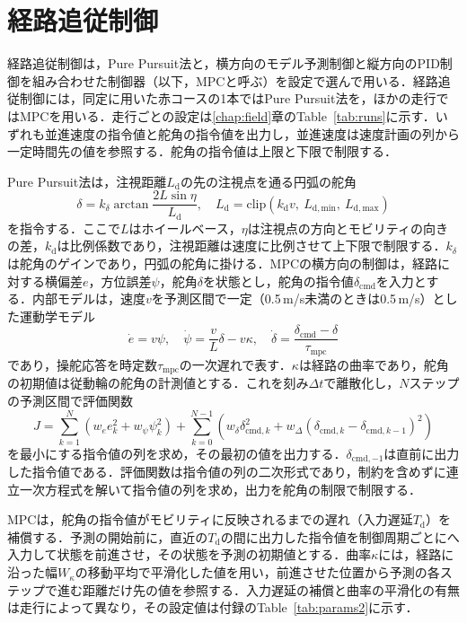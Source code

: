 \section{経路追従制御}
\label{sec:tracker}
経路追従制御は，Pure Pursuit法\cite{coulter1992}と，横方向のモデル予測制御と縦方向のPID制御を組み合わせた制御器（以下，MPCと呼ぶ）を設定で選んで用いる．経路追従制御には，同定に用いた赤コースの1本ではPure Pursuit法を，ほかの走行ではMPCを用いる．走行ごとの設定は\ref{chap:field}章のTable~\ref{tab:runs}に示す．いずれも並進速度の指令値と舵角の指令値を出力し，並進速度は速度計画の列から一定時間先の値を参照する．舵角の指令値は上限と下限で制限する．

Pure Pursuit法は，注視距離$L_{\mathrm{d}}$の先の注視点を通る円弧の舵角
\begin{equation}
  \delta = k_{\delta} \arctan\frac{2 L \sin\eta}{L_{\mathrm{d}}},\quad
  L_{\mathrm{d}} = \mathrm{clip}\left(k_{\mathrm{d}} v,\ L_{\mathrm{d,min}},\ L_{\mathrm{d,max}}\right)
  \label{eq:pp}
\end{equation}
を指令する．ここで$L$はホイールベース，$\eta$は注視点の方向とモビリティの向きの差，$k_{\mathrm{d}}$は比例係数であり，注視距離は速度に比例させて上下限で制限する．$k_{\delta}$は舵角のゲインであり，円弧の舵角に掛ける．MPCの横方向の制御は，経路に対する横偏差$e$，方位誤差$\psi$，舵角$\delta$を状態とし，舵角の指令値$\delta_{\mathrm{cmd}}$を入力とする．内部モデルは，速度$v$を予測区間で一定（0.5\,m/s未満のときは0.5\,m/s）とした運動学モデル
\begin{equation}
  \dot{e} = v\psi,\quad \dot{\psi} = \frac{v}{L}\delta - v\kappa,\quad \dot{\delta} = \frac{\delta_{\mathrm{cmd}} - \delta}{\tau_{\mathrm{mpc}}}
  \label{eq:mpc}
\end{equation}
であり，操舵応答を時定数$\tau_{\mathrm{mpc}}$の一次遅れで表す．$\kappa$は経路の曲率であり，舵角の初期値は従動輪の舵角の計測値とする．これを刻み$\Delta t$で離散化し，$N$ステップの予測区間で評価関数
\begin{equation}
  J = \sum_{k=1}^{N}\left(w_e e_k^2 + w_\psi \psi_k^2\right) + \sum_{k=0}^{N-1}\left(w_\delta \delta_{\mathrm{cmd},k}^2 + w_{\Delta}\left(\delta_{\mathrm{cmd},k}-\delta_{\mathrm{cmd},k-1}\right)^2\right)
  \label{eq:mpc_cost}
\end{equation}
を最小にする指令値の列を求め，その最初の値を出力する．$\delta_{\mathrm{cmd},-1}$は直前に出力した指令値である．評価関数は指令値の列の二次形式であり，制約を含めずに連立一次方程式を解いて指令値の列を求め，出力を舵角の制限で制限する．

MPCは，舵角の指令値がモビリティに反映されるまでの遅れ（入力遅延$T_{\mathrm{d}}$）を補償する．予測の開始前に，直近の$T_{\mathrm{d}}$の間に出力した指令値を制御周期ごとにへ入力して状態を前進させ，その状態を予測の初期値とする．曲率$\kappa$には，経路に沿った幅$W_\kappa$の移動平均で平滑化した値を用い，前進させた位置から予測の各ステップで進む距離だけ先の値を参照する．入力遅延の補償と曲率の平滑化の有無は走行によって異なり，その設定値は付録のTable~\ref{tab:params2}に示す．

